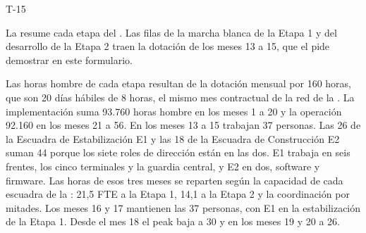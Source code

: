 \begin{formulario}{T-15}

La  resume cada etapa del . Las filas de la marcha blanca de la Etapa 1 y
del desarrollo de la Etapa 2 traen la dotación de los meses 13 a 15, que el  pide
demostrar en este formulario.

\begin{formularioTQuince}
\end{formularioTQuince}

Las horas hombre de cada etapa resultan de la dotación mensual por 160 horas, que son 20 días hábiles
de 8 horas, el mismo mes contractual de la red de la . La implementación suma
93.760 horas hombre en los meses 1 a 20 y la operación 92.160 en los meses 21 a 56. En los meses 13 a 15
trabajan 37 personas. Las 26 de la Escuadra de Estabilización E1 y las 18 de la Escuadra de Construcción
E2 suman 44 porque los siete roles de dirección están en las dos. E1 trabaja en seis frentes, los cinco
terminales y la guardia central, y E2 en dos, software y firmware. Las horas de esos tres meses se
reparten según la capacidad de cada escuadra de la : 21,5 FTE a la Etapa 1, 14,1 a la
Etapa 2 y la coordinación por mitades. Los meses 16 y 17 mantienen las 37 personas, con E1 en la
estabilización de la Etapa 1. Desde el mes 18 el peak baja a 30 y en los meses 19 y 20 a 26.


\end{formulario}
